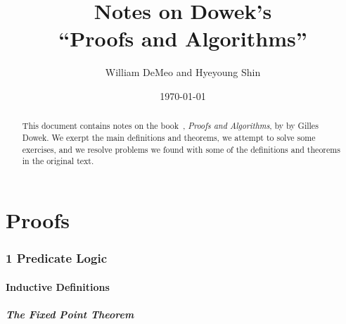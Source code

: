 % 


\starON
\title[Notes on Dowek]{Notes on Dowek's\\
 ``Proofs and Algorithms''}
\date{\today}
\author[W.~DeMeo and H.~Shin]{William DeMeo and Hyeyoung Shin}
\address{University of Hawaii}

\begin{abstract}
This document contains notes on the book~\cite{MR3012378}, {\it Proofs and
Algorithms}, by by Gilles Dowek.  We exerpt the main definitions and theorems,
we attempt to solve some exercises, and we resolve problems we found with some
of the definitions and theorems in the original text. 
\end{abstract}

\maketitle


\part{Proofs}

\section{1 Predicate Logic}

\subsection{Inductive Definitions}

\subsubsection{The Fixed Point Theorem}\

